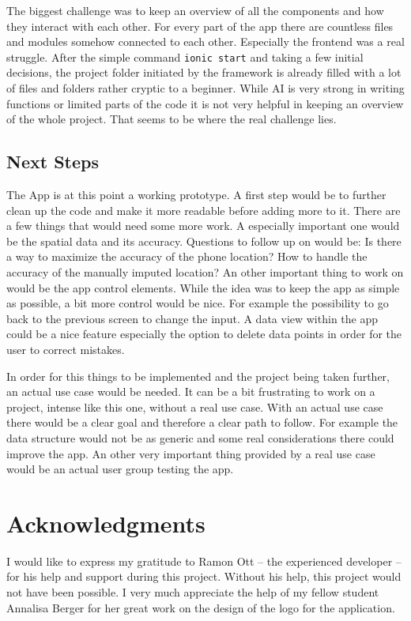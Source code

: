 \documentclass{josis}
\begin{document}
The biggest challenge was to keep an overview of all the components and how they interact with each other. For every part of the app there are countless
files and modules somehow connected to each other. Especially the frontend was a real struggle. After the simple command \texttt{ionic start} and
taking a few initial decisions, the project folder initiated by the framework is already filled with a lot of files and folders rather cryptic to a beginner. While AI is
very strong in writing functions or limited parts of the code it is not very helpful in keeping an overview of the whole project.
That seems to be where the real challenge lies.

\subsection{Next Steps}

The App is at this point a working prototype. A first step would be to further clean up the code and make it more readable before adding more to it.
There are a few things that would need some more work. A especially important one would be the spatial data and its accuracy.
Questions to follow up on would be: Is there a way to maximize the accuracy of the phone location? 
How to handle the accuracy of the manually imputed location?
An other important thing to work on would be the app control elements. While the idea was to keep the app as simple as possible,
a bit more control would be nice. For example the possibility to go back to the previous screen to change the input.
A data view within the app could be a nice feature especially the option to delete data points
in order for the user to correct mistakes.

In order for this things to be implemented and the project being taken further, an actual use case would be needed.
It can be a bit frustrating to work on a project, intense like this one, without a real use case.
With an actual use case there would be a clear goal and therefore a clear path to follow. For example the
data structure would not be as generic and some real considerations there could improve the app.
An other very important thing provided by a real use case would be an actual user group testing the app.

\section*{Acknowledgments}

I would like to express my gratitude to Ramon Ott -- the experienced developer -- for his help and support during this project. 
Without his help, this project would not have been possible.
I very much appreciate the help of my fellow student Annalisa Berger for her great work on the design of the logo for the application.
\end{document}
